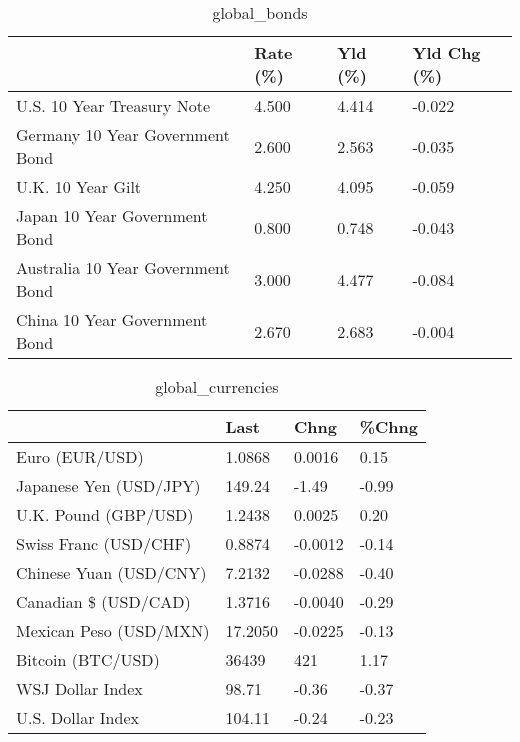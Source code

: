 \documentclass{article}%
\begin{document}
%


\begin{table}[htbp]%
\caption{global\_bonds}%
\centering%
\begin{adjustbox}{width=1\textwidth}%
\begin{tabular}{llll}
\toprule
                                  & Rate (\%) & Yld (\%) & Yld Chg (\%) \\
\midrule
       U.S. 10 Year Treasury Note &    4.500 &   4.414 &      -0.022 \\
  Germany 10 Year Government Bond &    2.600 &   2.563 &      -0.035 \\
                U.K. 10 Year Gilt &    4.250 &   4.095 &      -0.059 \\
    Japan 10 Year Government Bond &    0.800 &   0.748 &      -0.043 \\
Australia 10 Year Government Bond &    3.000 &   4.477 &      -0.084 \\
    China 10 Year Government Bond &    2.670 &   2.683 &      -0.004 \\
\bottomrule
\end{tabular}
%
\end{adjustbox}%
\end{table}

%


\begin{table}[htbp]%
\caption{global\_currencies}%
\centering%
\begin{adjustbox}{width=1\textwidth}%
\begin{tabular}{llll}
\toprule
                       &    Last &    Chng & \%Chng \\
\midrule
        Euro (EUR/USD) &  1.0868 &  0.0016 &  0.15 \\
Japanese Yen (USD/JPY) &  149.24 &   -1.49 & -0.99 \\
  U.K. Pound (GBP/USD) &  1.2438 &  0.0025 &  0.20 \\
 Swiss Franc (USD/CHF) &  0.8874 & -0.0012 & -0.14 \\
Chinese Yuan (USD/CNY) &  7.2132 & -0.0288 & -0.40 \\
  Canadian \$ (USD/CAD) &  1.3716 & -0.0040 & -0.29 \\
Mexican Peso (USD/MXN) & 17.2050 & -0.0225 & -0.13 \\
     Bitcoin (BTC/USD) &   36439 &     421 &  1.17 \\
      WSJ Dollar Index &   98.71 &   -0.36 & -0.37 \\
     U.S. Dollar Index &  104.11 &   -0.24 & -0.23 \\
\bottomrule
\end{tabular}
%
\end{adjustbox}%
\end{table}
\end{document}
